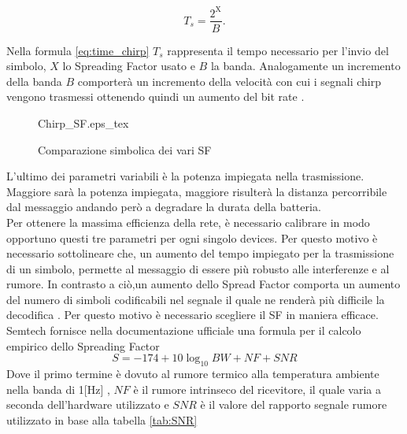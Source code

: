 \begin{equation}\label{eq:time_chirp}
        T_s=\frac{2^{\text{X}}}{B}.
\end{equation}

Nella formula \ref{eq:time_chirp} $T_s$ rappresenta il tempo necessario per
l'invio del simbolo, $X$ lo Spreading Factor usato e $B$ la banda.
Analogamente un incremento della banda $B$ comporterà un
incremento della velocità con cui i segnali chirp vengono trasmessi ottenendo
quindi un aumento del bit rate .

\begin{figure}[h]
        \centering 
        {Chirp_SF.eps_tex}
                \caption{Comparazione simbolica dei vari SF}
        \label{fig:sf_var}
\end{figure}

L'ultimo dei parametri variabili è la potenza impiegata nella trasmissione.
Maggiore sarà la potenza impiegata, maggiore risulterà la distanza percorribile
dal messaggio andando però a degradare la durata della batteria.\\
Per ottenere la massima efficienza della rete, è necessario calibrare in modo
opportuno questi tre parametri per ogni singolo devices. 
Per questo motivo è necessario sottolineare che, un aumento del tempo impiegato
per la trasmissione di un simbolo, permette al
messaggio di essere più robusto alle interferenze e al rumore. In contrasto a
ciò,un aumento dello  Spread Factor comporta un aumento del  numero di simboli 
codificabili nel segnale il quale ne renderà più difficile la decodifica  
. Per questo motivo è necessario scegliere il SF in
maniera efficace. Semtech fornisce nella documentazione ufficiale una formula
per il calcolo empirico dello Spreading Factor  
\begin{equation}
        S = -174+10\log_{10}BW + NF + SNR
\end{equation}
Dove il primo termine è dovuto al rumore termico alla temperatura ambiente nella
banda di 1[Hz] , $NF$ è il rumore intrinseco del ricevitore, il
quale varia  a seconda  dell'hardware utilizzato e 
$SNR$ è il valore del rapporto segnale rumore utilizzato in base alla tabella \ref{tab:SNR}

